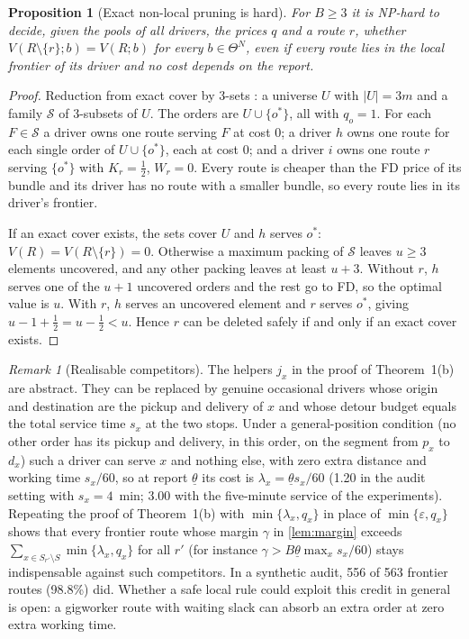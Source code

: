 \documentclass[11pt]{article}
\newtheorem{proposition}{Proposition}
\theoremstyle{definition}
\theoremstyle{remark}
\newtheorem{remark}{Remark}
\newcommand{\thl}{\underline{\theta}}
\begin{document}
\begin{proposition}[Exact non-local pruning is hard]\label{prop:nonlocal}
For $B\ge3$ it is NP-hard to decide, given the pools of all drivers, the prices
$q$ and a route $r$, whether $V(R\setminus\{r\};b)=V(R;b)$ for every
$b\in\Theta^N$, even if every route lies in the local frontier of its driver and
no cost depends on the report.
\end{proposition}

\begin{proof}
Reduction from exact cover by 3-sets \citep{garey1979computers}: a universe $U$
with $|U|=3m$ and a family $\mathcal S$ of 3-subsets of $U$. The orders are
$U\cup\{o^\ast\}$, all with $q_o=1$. For each $F\in\mathcal S$ a driver owns one
route serving $F$ at cost $0$; a driver $h$ owns one route for each single order
of $U\cup\{o^\ast\}$, each at cost $0$; and a driver $i$ owns one route $r$ serving
$\{o^\ast\}$ with $K_r=\tfrac12$, $W_r=0$. Every route is cheaper than the FD
price of its bundle and its driver has no route with a smaller bundle, so every
route lies in its driver's frontier.

If an exact cover exists, the sets cover $U$ and $h$ serves $o^\ast$:
$V(R)=V(R\setminus\{r\})=0$. Otherwise a maximum packing of $\mathcal S$ leaves
$u\ge3$ elements uncovered, and any other packing leaves at least $u+3$. Without
$r$, $h$ serves one of the $u+1$ uncovered orders and the rest go to FD, so the
optimal value is $u$. With $r$, $h$ serves an uncovered element and $r$ serves
$o^\ast$, giving $u-1+\tfrac12=u-\tfrac12<u$. Hence $r$ can be deleted safely if
and only if an exact cover exists.
\end{proof}

\begin{remark}[Realisable competitors]\label{rem:realisable}
The helpers $j_x$ in the proof of Theorem~1(b) are abstract. They can be
replaced by genuine occasional drivers whose origin and destination are the
pickup and delivery of $x$ and whose detour budget equals the total service
time $s_x$ at the two stops. Under a general-position condition (no other order
has its pickup and delivery, in this order, on the segment from $p_x$ to $d_x$)
such a driver can serve $x$ and nothing else, with zero extra distance and
working time $s_x/60$, so at report $\thl$ its cost is
$\lambda_x=\thl s_x/60$ (1.20 in the audit setting with $s_x=4$~min; 3.00 with
the five-minute service of the experiments). Repeating the proof of
Theorem~1(b) with $\min\{\lambda_x,q_x\}$ in place of $\min\{\varepsilon,q_x\}$
shows that every frontier route whose margin $\gamma$ in \cref{lem:margin}
exceeds $\sum_{x\in S_{r'}\setminus S}\min\{\lambda_x,q_x\}$ for all $r'$ (for
instance $\gamma>B\thl\max_x s_x/60$) stays indispensable against such
competitors. In a synthetic audit, 556 of 563 frontier routes (98.8\%) did.
Whether a safe local rule could exploit this credit in general is open: a
gigworker route with waiting slack can absorb an extra order at zero extra
working time.
\end{remark}
\end{document}
